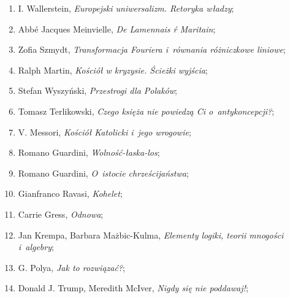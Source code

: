\documentclass[a4paper,11pt]{article}
\begin{document}
\begin{enumerate}
\item I. Wallerstein, \textit{Europejski uniwersalizm. Retoryka władzy};



\item Abbé Jacques Meinvielle, \textit{De Lamennais ŕ Maritain};



\item Zofia Szmydt, \textit{Transformacja Fouriera i~równania różniczkowe
    liniowe};



\item Ralph Martin, \textit{Kościół w kryzysie. Ścieżki wyjścia};



\item Stefan Wyszyński, \textit{Przestrogi dla Polaków};



\item Tomasz Terlikowski, \textit{Czego księża nie powiedzą Ci
    o~antykoncepcji?};



\item V. Messori, \textit{Kościół Katolicki i~jego wrogowie};



\item Romano Guardini, \textit{Wolność-łaska-los};



\item Romano Guardini, \textit{O~istocie chrześcijaństwa};



\item Gianfranco Ravasi, \textit{Kohelet};



\item Carrie Gress, \textit{Odnowa};



\item Jan Krempa, Barbara Mażbic-Kulma, \textit{Elementy logiki, teorii
    mnogości i~algebry};



\item G. Polya, \textit{Jak to rozwiązać?};



\item Donald J. Trump, Meredith McIver, \textit{Nigdy się nie poddawaj!};




\end{enumerate}
\end{document}

